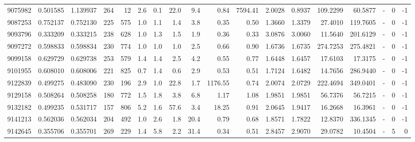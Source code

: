 \begin{tabular}{rrrrrrrrrrrrrrrlrr}
   9075982 & 0.501585 &   1.139937 &  264 &   12 &      2.6 &      0.1 &    22.0 &      9.4 &       0.84 &     7594.41 &  2.0028 &  0.8937 &  109.2299 &   60.5877 &             - &        0 &         -1 \\
   9087253 & 0.752137 &   0.752130 &  225 &  575 &      1.0 &      1.1 &     1.4 &      3.8 &       0.35 &        0.50 &  1.3660 &  1.3379 &   27.4010 &  119.7605 &             - &        0 &         -1 \\
   9093796 & 0.333209 &   0.333215 &  238 &  628 &      1.0 &      1.3 &     1.5 &      1.9 &       0.36 &        0.33 &  3.0876 &  3.0060 &   11.5640 &  201.6129 &             - &        0 &         -1 \\
   9097272 & 0.598833 &   0.598834 &  230 &  774 &      1.0 &      1.0 &     1.0 &      2.5 &       0.66 &        0.90 &  1.6736 &  1.6735 &  274.7253 &  275.4821 &             - &        0 &         -1 \\
   9099158 & 0.629729 &   0.629738 &  253 &  579 &      1.4 &      1.4 &     2.5 &      4.2 &       0.55 &        0.77 &  1.6448 &  1.6457 &   17.6103 &   17.3175 &             - &        0 &         -1 \\
   9101955 & 0.608010 &   0.608006 &  221 &  825 &      0.7 &      1.4 &     0.6 &      2.9 &       0.53 &        0.51 &  1.7124 &  1.6482 &   14.7656 &  286.9440 &             - &        0 &         -1 \\
   9122839 & 0.499275 &   0.483090 &  230 &  196 &      2.9 &      1.0 &    22.8 &      1.7 &    1176.55 &        0.74 &  2.0074 &  2.0729 &  222.4694 &  349.0401 &             - &        0 &         -1 \\
   9129158 & 0.508264 &   0.508258 &  180 &  772 &      1.5 &      1.8 &     3.8 &      6.8 &       1.17 &        1.08 &  1.9851 &  1.9851 &   56.7376 &   56.7215 &             - &        0 &         -1 \\
   9132182 & 0.499235 &   0.531717 &  157 &  806 &      5.2 &      1.6 &    57.6 &      3.4 &      18.25 &        0.91 &  2.0645 &  1.9417 &   16.2668 &   16.3961 &             - &        0 &         -1 \\
   9141213 & 0.562036 &   0.562034 &  204 &  492 &      1.0 &      2.6 &     1.8 &     20.4 &       0.79 &        0.68 &  1.8571 &  1.7822 &   12.8370 &  336.1345 &             - &        0 &         -1 \\
   9142645 & 0.355706 &   0.355701 &  269 &  229 &      1.4 &      5.8 &     2.2 &     31.4 &       0.34 &        0.51 &  2.8457 &  2.9070 &   29.0782 &   10.4504 &             - &        5 &          0 \\

\end{tabular}
